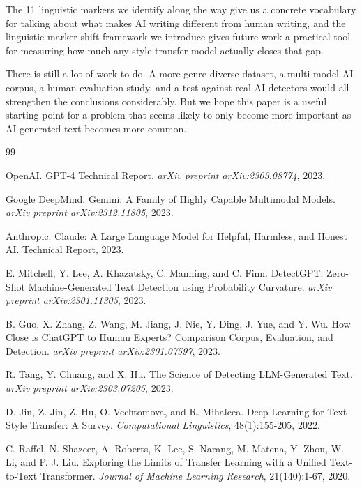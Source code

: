 \documentclass{article}
\begin{document}
The 11 linguistic markers we identify along the way give us a concrete vocabulary for talking about what makes AI writing different from human writing, and the linguistic marker shift framework we introduce gives future work a practical tool for measuring how much any style transfer model actually closes that gap.

There is still a lot of work to do. A more genre-diverse dataset, a multi-model AI corpus, a human evaluation study, and a test against real AI detectors would all strengthen the conclusions considerably. But we hope this paper is a useful starting point for a problem that seems likely to only become more important as AI-generated text becomes more common.

\begin{thebibliography}{99}

OpenAI. GPT-4 Technical Report. \textit{arXiv preprint arXiv:2303.08774}, 2023.

Google DeepMind. Gemini: A Family of Highly Capable Multimodal Models. \textit{arXiv preprint arXiv:2312.11805}, 2023.

Anthropic. Claude: A Large Language Model for Helpful, Harmless, and Honest AI. Technical Report, 2023.

E. Mitchell, Y. Lee, A. Khazatsky, C. Manning, and C. Finn. DetectGPT: Zero-Shot Machine-Generated Text Detection using Probability Curvature. \textit{arXiv preprint arXiv:2301.11305}, 2023.

B. Guo, X. Zhang, Z. Wang, M. Jiang, J. Nie, Y. Ding, J. Yue, and Y. Wu. How Close is ChatGPT to Human Experts? Comparison Corpus, Evaluation, and Detection. \textit{arXiv preprint arXiv:2301.07597}, 2023.

R. Tang, Y. Chuang, and X. Hu. The Science of Detecting LLM-Generated Text. \textit{arXiv preprint arXiv:2303.07205}, 2023.

D. Jin, Z. Jin, Z. Hu, O. Vechtomova, and R. Mihalcea. Deep Learning for Text Style Transfer: A Survey. \textit{Computational Linguistics}, 48(1):155-205, 2022.

C. Raffel, N. Shazeer, A. Roberts, K. Lee, S. Narang, M. Matena, Y. Zhou, W. Li, and P. J. Liu. Exploring the Limits of Transfer Learning with a Unified Text-to-Text Transformer. \textit{Journal of Machine Learning Research}, 21(140):1-67, 2020.


\end{thebibliography}
\end{document}
